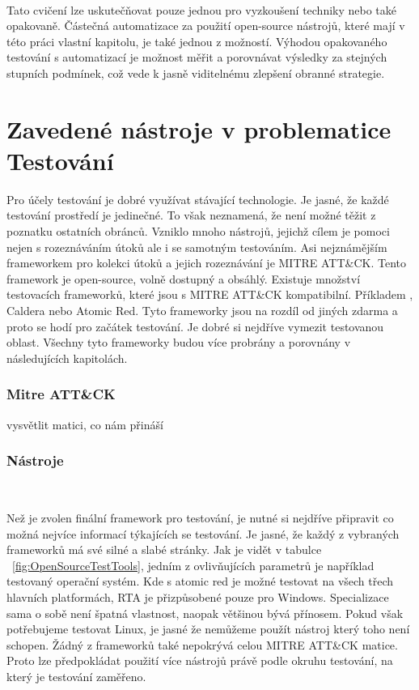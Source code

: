 \paragraph{}
Tato cvičení lze uskutečňovat pouze jednou pro vyzkoušení techniky nebo také opakovaně.
Částečná automatizace za použití open-source nástrojů, které mají v této práci vlastní kapitolu, je také jednou z možností.
Výhodou opakovaného testování s automatizací je možnost měřit a porovnávat výsledky za stejných stupních podmínek, což vede k jasně viditelnému zlepšení obranné strategie.\cite{securityInteligence_pen_test_red_team_purple_team,redscan_team_purple_team}

\section{Zavedené nástroje v problematice Testování}
Pro účely testování je dobré využívat stávající technologie.
Je jasné, že každé testování prostředí je jedinečné.
To však neznamená, že není možné těžit z poznatku ostatních obránců.
Vzniklo mnoho nástrojů, jejichž cílem je pomoci nejen s rozeznáváním útoků ale i se samotným testováním.
Asi nejznámějším frameworkem pro kolekci útoků a jejich rozeznávání je MITRE ATT\&CK\cite{mitre_attack_framework}.
Tento framework je open-source, volně dostupný a obsáhlý.
Existuje množství testovacích frameworků, které jsou s MITRE ATT\&CK kompatibilní\cite{csoonline_4_testing_frameworks}.
Příkladem , Caldera nebo Atomic Red.
Tyto frameworky jsou na rozdíl od jiných zdarma a proto se hodí pro začátek testování.
Je dobré si nejdříve vymezit testovanou oblast.
Všechny tyto frameworky budou více probrány a porovnány v následujících kapitolách.

\subsubsection{Mitre ATT\&CK}
vysvětlit matici, co nám přináší

\subsubsection{Nástroje}
~\label{fig:OpenSourceTestTools}

Než je zvolen finální framework pro testování, je nutné si nejdříve připravit co možná nejvíce informací týkajících se testování.
Je jasné, že každý z vybraných frameworků má své silné a slabé stránky.
Jak je vidět v tabulce ~\ref{fig:OpenSourceTestTools}, jedním z ovlivňujících parametrů je například testovaný operační systém.
Kde s atomic red je možné testovat na všech třech hlavních platformách, \ac{RTA} je přizpůsobené pouze pro Windows.
Specializace sama o sobě není špatná vlastnost, naopak většinou bývá přínosem.
Pokud však potřebujeme testovat Linux, je jasné že nemůžeme použít nástroj který toho není schopen.
Žádný z frameworků také nepokrývá celou MITRE ATT\&CK matice.
Proto lze předpokládat použití více nástrojů právě podle okruhu testování, na který je testování zaměřeno.

